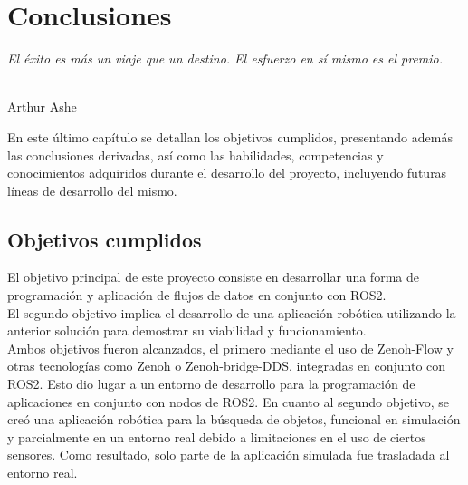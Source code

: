 \chapter{Conclusiones}
\label{cap:capitulo6}

\begin{flushright}
\begin{minipage}[]{10cm}
\emph{El éxito es más un viaje que un destino. El esfuerzo en sí mismo es el premio.}\\
\end{minipage}\\

Arthur Ashe\\
\end{flushright}

\vspace{1cm}


En este último capítulo se detallan los objetivos cumplidos, presentando además
las conclusiones derivadas, así como las habilidades, competencias y
conocimientos adquiridos durante el desarrollo del proyecto, incluyendo futuras
líneas de desarrollo del mismo.

\section{Objetivos cumplidos}
\label{sec:objetivos_cumplidos}

El objetivo principal de este proyecto consiste en desarrollar una forma de
programación y aplicación de flujos de datos en conjunto con ROS2.
\\

El segundo objetivo implica el desarrollo de una aplicación robótica utilizando
la anterior solución para demostrar su viabilidad y funcionamiento.
\\

Ambos objetivos fueron alcanzados, el primero mediante el uso de Zenoh-Flow y
otras tecnologías como Zenoh o Zenoh-bridge-DDS, integradas en conjunto con
ROS2.
Esto dio lugar a un entorno de desarrollo para la programación de aplicaciones en
conjunto con nodos de ROS2.
En cuanto al segundo objetivo, se creó una aplicación robótica para la búsqueda
de objetos, funcional en simulación y parcialmente en un entorno real debido a
limitaciones en el uso de ciertos sensores.
Como resultado, solo parte de la aplicación simulada fue trasladada al entorno
real.
\\

